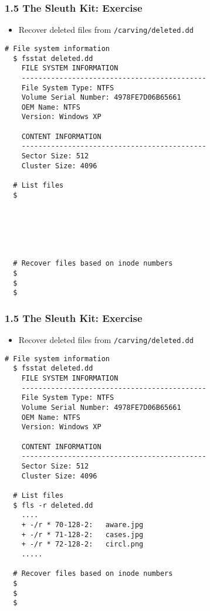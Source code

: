 \begin{frame}[fragile]
  \frametitle{1.5 The Sleuth Kit: Exercise}
    \begin{itemize}
        \item[] Recover deleted files from \texttt{/carving/deleted.dd}
    \end{itemize}
  \begin{lstlisting}[basicstyle=\tiny\ttfamily]
  # File system information
  $ fsstat deleted.dd
	FILE SYSTEM INFORMATION
	--------------------------------------------
	File System Type: NTFS
	Volume Serial Number: 4978FE7D06B65661
	OEM Name: NTFS
	Version: Windows XP

	CONTENT INFORMATION
	--------------------------------------------
	Sector Size: 512
	Cluster Size: 4096

  # List files
  $ 






  # Recover files based on inode numbers
  $ 
  $ 
  $ 
  \end{lstlisting}
\end{frame}


\begin{frame}[fragile]
  \frametitle{1.5 The Sleuth Kit: Exercise}
    \begin{itemize}
        \item[] Recover deleted files from \texttt{/carving/deleted.dd}
    \end{itemize}
  \begin{lstlisting}[basicstyle=\tiny\ttfamily]
  # File system information
  $ fsstat deleted.dd
	FILE SYSTEM INFORMATION
	--------------------------------------------
	File System Type: NTFS
	Volume Serial Number: 4978FE7D06B65661
	OEM Name: NTFS
	Version: Windows XP

	CONTENT INFORMATION
	--------------------------------------------
	Sector Size: 512
	Cluster Size: 4096

  # List files
  $ fls -r deleted.dd
	....
	+ -/r * 70-128-2:	aware.jpg
	+ -/r * 71-128-2:	cases.jpg
	+ -/r * 72-128-2:	circl.png
	.....

  # Recover files based on inode numbers
  $
  $ 
  $ 
  \end{lstlisting}
\end{frame}


